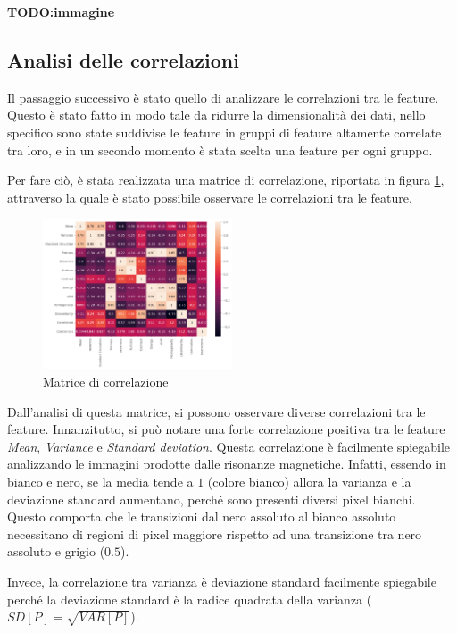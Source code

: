 \textbf{TODO:immagine}

\subsection{Analisi delle correlazioni}
Il passaggio successivo è  stato quello di analizzare le correlazioni tra le feature.
Questo è stato fatto in modo tale da ridurre la dimensionalità dei dati, nello
specifico sono state suddivise le feature in gruppi di feature altamente correlate
tra loro, e in un secondo momento è stata scelta una feature per ogni gruppo.

Per fare ciò, è stata realizzata una matrice di correlazione, riportata in figura
\ref{fig:corr-matrix}, attraverso la quale è stato possibile osservare le correlazioni
tra le feature.

\begin{figure}[!ht]
      \centering
      \includegraphics[width=0.5\textwidth]{img/analisi/corr.png}
      \caption{Matrice di correlazione}
      \label{fig:corr-matrix}
\end{figure}

Dall'analisi di questa matrice, si possono osservare diverse correlazioni tra le
feature. Innanzitutto, si può notare una forte correlazione positiva tra le feature
\textit{Mean}, \textit{Variance} e \textit{Standard deviation}. Questa correlazione
è facilmente spiegabile analizzando le immagini prodotte dalle risonanze magnetiche.
Infatti, essendo in bianco e nero, se la media tende a $1$ (colore bianco) allora
la varianza e la deviazione standard aumentano, perché sono presenti diversi
pixel bianchi. Questo comporta che le transizioni dal nero assoluto al bianco
assoluto necessitano di regioni di pixel maggiore rispetto ad una transizione
tra nero assoluto e grigio ($0.5$).

Invece, la correlazione tra varianza è deviazione standard facilmente spiegabile
perché la deviazione standard è la radice quadrata della varianza ($SD[P] = \sqrt{VAR[P]}$).

